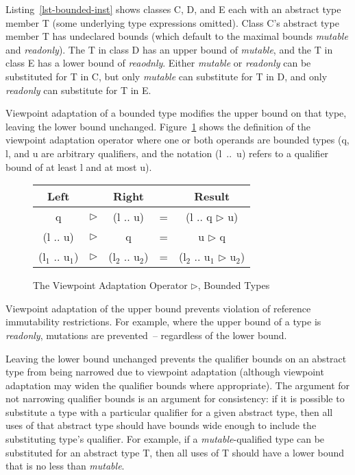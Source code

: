 Listing~\ref{lst-bounded-inst} shows classes {\cd C}, {\cd D}, and {\cd E} each with
an abstract type member {\cd T} (some underlying type expressions omitted).
Class {\cd C}'s abstract type member {\cd T} has undeclared bounds (which default to the
maximal bounds {\em mutable} and {\em readonly}).
The {\cd T} in class {\cd D} has an upper bound of {\em mutable},
and the {\cd T} in class {\cd E} has a lower bound of {\em reaodnly}.
Either {\em mutable} or {\em readonly} can be substituted for {\cd T} in {\cd C},
but only {\em mutable} can substitute for {\cd T} in {\cd D},
and only {\em readonly} can substitute for {\cd T} in {\cd E}.

Viewpoint adaptation of a bounded type modifies the upper bound on that type,
leaving the lower bound unchanged.
Figure~\ref{fig-vp-bounded} shows the definition of the viewpoint adaptation operator
where one or both operands are bounded types
(q, l, and u are arbitrary qualifiers, and the notation \mbox{(l .. u)} refers to a qualifier bound
of at least l and at most u).

\begin{figure}[htp]
	\center
	\begin{tabular}{ccccc}
		Left & & Right & & Result \\
		\hline
		q & $\triangleright$ & (l .. u) & = & (l .. q $\triangleright$ u) \\
		(l .. u) & $\triangleright$ & q & = & u $\triangleright$ q \\
		(\mbox{l$_1$} .. \mbox{u$_1$}) & $\triangleright$ & (\mbox{l$_2$} .. \mbox{u$_2$}) & = &
			(\mbox{l$_2$} ..
				\mbox{u$_1$} $\triangleright$ \mbox{u$_2$}) \\
	\end{tabular}
	\caption{The Viewpoint Adaptation Operator $\triangleright$, Bounded Types}
	\label{fig-vp-bounded}
\end{figure}

Viewpoint adaptation of the upper bound prevents violation of reference immutability
restrictions. For example,
where the upper bound of a type is {\em readonly}, mutations are prevented~--
regardless of the lower bound.

Leaving the lower bound unchanged prevents the qualifier bounds on an abstract type
from being narrowed due to viewpoint adaptation (although viewpoint adaptation may
widen the qualifier bounds where appropriate).
The argument for not narrowing qualifier bounds is an argument for consistency:
if it is possible to substitute a type with a particular qualifier for a given
abstract type, then all uses of that abstract type should have bounds wide enough
to include the substituting type's qualifier.
For example, if a {\em mutable}-qualified type can be substituted for an abstract type {\cd T},
then all uses of {\cd T} should have a lower bound that is no less than {\em mutable}.


